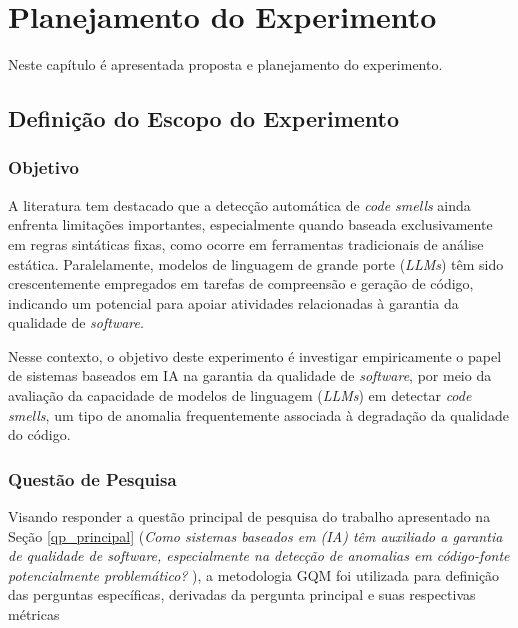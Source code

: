 \chapter[Planejamento do Experimento]{Planejamento do Experimento}

Neste capítulo é apresentada proposta e planejamento do experimento.

\section{Definição do Escopo do Experimento}

\subsection{Objetivo}

A literatura tem destacado que a detecção automática de
\textit{code smells} ainda enfrenta limitações importantes, especialmente quando baseada
exclusivamente em regras sintáticas fixas, como ocorre em ferramentas tradicionais de
análise estática. Paralelamente,  modelos de linguagem de grande porte (\textit{LLMs}) têm sido
crescentemente empregados em tarefas de compreensão e geração de código, indicando
um potencial para apoiar atividades relacionadas à garantia da qualidade de \textit{software}.

Nesse contexto, o objetivo deste experimento é investigar empiricamente o papel de sistemas baseados em IA na garantia da qualidade de \textit{software}, 
por meio da avaliação da capacidade de modelos de linguagem (\textit{LLMs}) em detectar \textit{code smells}, um tipo de anomalia 
frequentemente associada à degradação da qualidade do código.

\subsection{Questão de Pesquisa}

Visando responder a questão principal de pesquisa do trabalho apresentado na Seção \ref{qp_principal} 
(\textit{Como sistemas baseados em (IA) têm auxiliado a garantia de qualidade de \textit{software}, especialmente 
na detecção de anomalias em código-fonte potencialmente problemático? }), a metodologia GQM  
foi utilizada para definição das perguntas específicas, derivadas da pergunta principal e suas respectivas métricas

